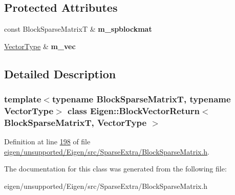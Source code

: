 \subsection*{Protected Attributes}
\begin{DoxyCompactItemize}
\item 
\mbox{\label{class_eigen_1_1_block_vector_return_a817e27afb4ed0e8b58335b49a26a28c1}} 
const Block\+Sparse\+MatrixT \& {\bfseries m\+\_\+spblockmat}
\item 
\mbox{\label{class_eigen_1_1_block_vector_return_a94208052b9597d9d139950e38dcb55d4}} 
\hyperlink{struct_vector_type}{Vector\+Type} \& {\bfseries m\+\_\+vec}
\end{DoxyCompactItemize}


\subsection{Detailed Description}
\subsubsection*{template$<$typename Block\+Sparse\+MatrixT, typename Vector\+Type$>$\newline
class Eigen\+::\+Block\+Vector\+Return$<$ Block\+Sparse\+Matrix\+T, Vector\+Type $>$}



Definition at line \hyperlink{eigen_2unsupported_2_eigen_2src_2_sparse_extra_2_block_sparse_matrix_8h_source_l00198}{198} of file \hyperlink{eigen_2unsupported_2_eigen_2src_2_sparse_extra_2_block_sparse_matrix_8h_source}{eigen/unsupported/\+Eigen/src/\+Sparse\+Extra/\+Block\+Sparse\+Matrix.\+h}.



The documentation for this class was generated from the following file\+:\begin{DoxyCompactItemize}
\item 
eigen/unsupported/\+Eigen/src/\+Sparse\+Extra/\+Block\+Sparse\+Matrix.\+h\end{DoxyCompactItemize}
